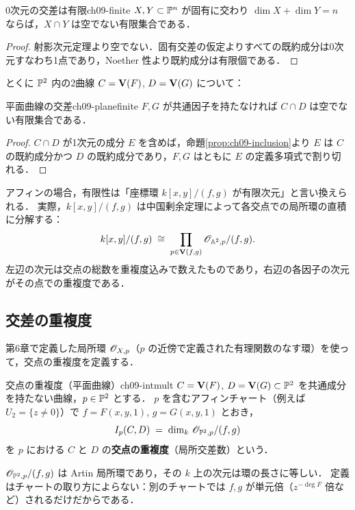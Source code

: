 \begin{myprop}{0次元の交差は有限}{ch09-finite}
$X,Y\subset\mathbb{P}^n$ が固有に交わり $\dim X+\dim Y=n$ ならば，$X\cap Y$ は空でない有限集合である．
\end{myprop}

\begin{proof}
射影次元定理より空でない．固有交差の仮定よりすべての既約成分は0次元すなわち1点であり，Noether 性より既約成分は有限個である．
\end{proof}

とくに $\mathbb{P}^2$ 内の2曲線 $C=\mathbf{V}(F)$, $D=\mathbf{V}(G)$ について：

\begin{mycor}{平面曲線の交差}{ch09-planefinite}
$F,G$ が共通因子を持たなければ $C\cap D$ は空でない有限集合である．
\end{mycor}

\begin{proof}
$C\cap D$ が1次元の成分 $E$ を含めば，命題\ref{prop:ch09-inclusion}より $E$ は $C$ の既約成分かつ $D$ の既約成分であり，$F,G$ はともに $E$ の定義多項式で割り切れる．
\end{proof}

アフィンの場合，有限性は「座標環 $k[x,y]/(f,g)$ が有限次元」と言い換えられる．
実際，$k[x,y]/(f,g)$ は中国剰余定理によって各交点での局所環の直積に分解する：
\begin{equation}\label{eq:ch09-crt}
  k[x,y]/(f,g)\;\cong\;\prod_{p\in\mathbf{V}(f,g)}\mathscr{O}_{\mathbb{A}^2,p}/(f,g).
\end{equation}
左辺の次元は交点の総数を重複度込みで数えたものであり，右辺の各因子の次元がその点での重複度である．

\subsection{交差の重複度}

第6章で定義した局所環 $\mathscr{O}_{X,p}$（$p$ の近傍で定義された有理関数のなす環）を使って，交点の重複度を定義する．

\begin{mydef}{交点の重複度（平面曲線）}{ch09-intmult}
$C=\mathbf{V}(F)$, $D=\mathbf{V}(G)\subset\mathbb{P}^2$ を共通成分を持たない曲線，$p\in\mathbb{P}^2$ とする．
$p$ を含むアフィンチャート（例えば $U_2=\{z\neq0\}$）で $f=F(x,y,1)$, $g=G(x,y,1)$ とおき，
\[
  I_p(C,D)\;=\;\dim_k\,\mathscr{O}_{\mathbb{P}^2,p}/(f,g)
\]
を $p$ における $C$ と $D$ の\textbf{交点の重複度}（局所交差数）という．
\end{mydef}

$\mathscr{O}_{\mathbb{P}^2,p}/(f,g)$ は Artin 局所環であり，その $k$ 上の次元は環の長さに等しい．
定義はチャートの取り方によらない：別のチャートでは $f,g$ が単元倍（$z^{-\deg F}$ 倍など）されるだけだからである．

